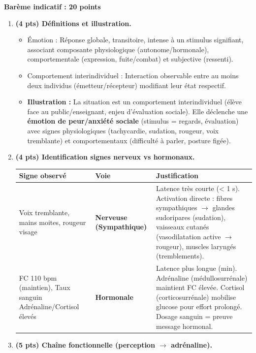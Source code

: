 \documentclass[11pt]{article}
\newcommand{\cle}[1]{{\popxbold\color{popdark}#1}}
\newcounter{popsec}
\newcounter{popsub}
\newcommand{\courssub}[1]{%
  \stepcounter{popsub}%
  \par\vspace{9pt}\noindent{\popxbold\fontsize{11.5}{13}\selectfont\color{popink}{\color{poporange}\thepopsec.\thepopsub}\hspace{6pt}#1}\par\nopagebreak\vspace{4pt}
}
\begin{document}
\courssub{Je me prépare au Probatoire}

\begin{corrige}
\textbf{Barème indicatif : 20 points}
\begin{enumerate}
\item \textbf{(4 pts) Définitions et illustration.}
\begin{itemize}
\item \cle{Émotion} : Réponse globale, transitoire, intense à un stimulus signifiant, associant composante physiologique (autonome/hormonale), comportementale (expression, fuite/combat) et subjective (ressenti).
\item \cle{Comportement interindividuel} : Interaction observable entre au moins deux individus (émetteur/récepteur) modifiant leur état respectif.
\item \textbf{Illustration :} La situation est un comportement interindividuel (élève face au public/enseignant, enjeu d'évaluation sociale). Elle déclenche une \textbf{émotion de peur/anxiété sociale} (stimulus = regards, évaluation) avec signes physiologiques (tachycardie, sudation, rougeur, voix tremblante) et comportementaux (difficulté à parler, posture figée).
\end{itemize}
\item \textbf{(4 pts) Identification signes nerveux vs hormonaux.}
\begin{center}
\begin{tabularx}{\linewidth}{|l|X|X|}
\hline
\rowcolor{popblueL} \textbf{Signe observé} & \textbf{Voie} & \textbf{Justification} \\
\hline
Voix tremblante, mains moites, rougeur visage & \textbf{Nerveuse (Sympathique)} & Latence très courte (< 1 s). Activation directe : fibres sympathiques $\to$ glandes sudoripares (sudation), vaisseaux cutanés (vasodilatation active $\to$ rougeur), muscles laryngés (tremblements). \\
\hline
FC 110 bpm (maintien), Taux sanguin Adrénaline/Cortisol élevés & \textbf{Hormonale} & Latence plus longue (min). Adrénaline (médullosurrénale) maintient FC élevée. Cortisol (corticosurrénale) mobilise glucose pour effort prolongé. Dosage sanguin = preuve message hormonal. \\
\hline
\end{tabularx}
\end{center}
\item \textbf{(5 pts) Chaîne fonctionnelle (perception $\to$ adrénaline).}

\end{enumerate}
\end{corrige}
\end{document}
